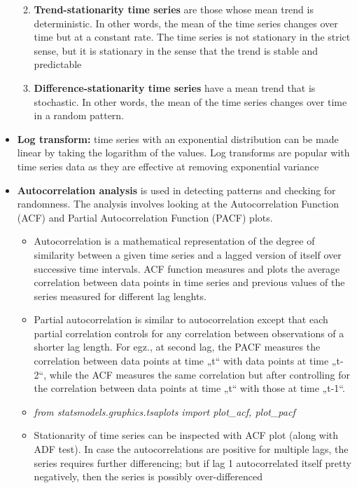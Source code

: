 \documentclass[
  letterpaper,
]{book}
\providecommand{\tightlist}{%
  \setlength{\itemsep}{0pt}\setlength{\parskip}{0pt}}\usepackage{longtable,booktabs,array}
\begin{document}
\begin{itemize}
  \begin{enumerate}
  \def\labelenumi{\alph{enumi}.}
  \tightlist
  \item
    \textbf{Trend-stationarity time series} are those whose mean trend
    is deterministic. In other words, the mean of the time series
    changes over time but at a constant rate. The time series is not
    stationary in the strict sense, but it is stationary in the sense
    that the trend is stable and predictable
  \item
    \textbf{Difference-stationarity time series} have a mean trend that
    is stochastic. In other words, the mean of the time series changes
    over time in a random pattern.
  \end{enumerate}
\item
  \textbf{Log transform:} time series with an exponential distribution
  can be made linear by taking the logarithm of the values. Log
  transforms are popular with time series data as they are effective at
  removing exponential variance
\item
  \textbf{Autocorrelation analysis} is used in detecting patterns and
  checking for randomness. The analysis involves looking at the
  Autocorrelation Function (ACF) and Partial Autocorrelation Function
  (PACF) plots.

  \begin{itemize}
  \tightlist
  \item
    Autocorrelation is a mathematical representation of the degree of
    similarity between a given time series and a lagged version of
    itself over successive time intervals. ACF function measures and
    plots the average correlation between data points in time series and
    previous values of the series measured for different lag lenghts.
  \item
    Partial autocorrelation is similar to autocorrelation except that
    each partial correlation controls for any correlation between
    observations of a shorter lag length. For egz., at second lag, the
    PACF measures the correlation between data points at time „t`` with
    data points at time „t-2``, while the ACF measures the same
    correlation but after controlling for the correlation between data
    points at time „t`` with those at time „t-1``.
  \item
    \emph{from statsmodels.graphics.tsaplots import plot\_acf,
    plot\_pacf}
  \item
    Stationarity of time series can be inspected with ACF plot (along
    with ADF test). In case the autocorrelations are positive for
    multiple lags, the series requires further differencing; but if lag
    1 autocorrelated itself pretty negatively, then the series is
    possibly over-differenced
  \end{itemize}
\end{itemize}
\end{document}
